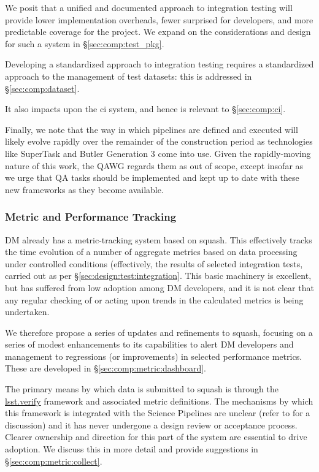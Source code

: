 We posit that a unified and documented approach to integration testing will
provide lower implementation overheads, fewer surprised for developers, and
more predictable coverage for the project. We expand on the considerations and
design for such a system in \S\ref{sec:comp:test_pkg}.

Developing a standardized approach to integration testing requires a
standardized approach to the management of test datasets: this is addressed in
\S\ref{sec:comp:dataset}.

It also impacts upon the \gls{ci} system, and hence is relevant to
\S\ref{sec:comp:ci}.

Finally, we note that the way in which pipelines are defined and executed will
likely evolve rapidly over the remainder of the construction period as
technologies like SuperTask and Butler Generation 3 come into use. Given the
rapidly-moving nature of this work, the QAWG regards them as out of scope,
except insofar as we urge that QA tasks should be implemented and kept up to
date with these new frameworks as they become available.

\subsubsection{Metric and Performance Tracking}
\label{sec:design:test:metrics}

DM already has a metric-tracking system based on \gls{squash}. This
effectively tracks the time evolution of a number of \glspl{aggregate metric}
based on data processing under controlled conditions (effectively, the results
of selected integration tests, carried out as per
\S\ref{sec:design:test:integration}. This basic machinery is excellent, but
has suffered from low adoption among DM developers, and it is not clear that
any regular checking of or acting upon trends in the calculated metrics is
being undertaken.

We therefore propose a series of updates and refinements to \gls{squash},
focusing on a series of modest enhancements to its capabilities to alert DM
developers and management to regressions (or improvements) in selected
performance metrics. These are developed in \S\ref{sec:comp:metric:dashboard}.

The primary means by which data is submitted to \gls{squash} is through the
\href{https://github.com/lsst/verify}{lsst.verify} framework and associated
metric definitions. The mechanisms by which this framework is integrated with
the Science Pipelines are unclear (refer to  for a
discussion) and it has never undergone a design review or acceptance process.
Clearer ownership and direction for this part of the system are essential to
drive adoption. We discuss this in more detail and provide suggestions in
\S\ref{sec:comp:metric:collect}.
